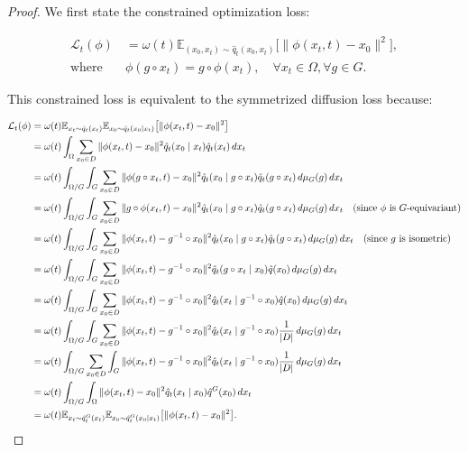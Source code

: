 \begin{proof}
    We first state the constrained optimization loss:

\begin{align*}
    \mathcal{L}_t(\phi) &= \omega(t) \mathbb{E}_{(x_0, x_t) \sim \hat{q}_t(x_0, x_t)} \big[ \| \phi(x_t, t) - x_0 \|^2 \big], \\
    \text{where} \quad &\phi(g \circ x_t) = g \circ \phi(x_t), \quad \forall x_t \in \Omega, \forall g \in G.
\end{align*}

This constrained loss is equivalent to the symmetrized diffusion loss because:

\begin{align*}
    \mathcal{L}_t(\phi) &= \omega(t) \mathbb{E}_{x_t \sim \hat{q}_t(x_t)} \mathbb{E}_{x_0 \sim \hat{q}_t(x_0 \mid x_t)} \big[ \| \phi(x_t, t) - x_0 \|^2 \big] \\
    &= \omega(t) \int_\Omega \sum_{x_0 \in D} \| \phi(x_t, t) - x_0 \|^2 \hat{q}_t(x_0 \mid x_t) \hat{q}_t(x_t) \,dx_t \\
    &= \omega(t) \int_{\Omega / G} \int_G \sum_{x_0 \in D} \| \phi(g \circ x_t, t) - x_0 \|^2 \hat{q}_t(x_0 \mid g \circ x_t) \hat{q}_t( g \circ x_t) \,d\mu_G(g) \,dx_t \\
    &= \omega(t) \int_{\Omega / G} \int_G \sum_{x_0 \in D} \| g \circ \phi(x_t, t) - x_0 \|^2 \hat{q}_t(x_0 \mid g \circ x_t) \hat{q}_t( g \circ x_t) \,d\mu_G(g) \,dx_t \quad \text{(since \( \phi \) is \( G \)-equivariant)} \\
    &= \omega(t) \int_{\Omega / G} \int_G \sum_{x_0 \in D} \|\phi( x_t, t) - g^{-1} \circ x_0 \|^2 \hat{q}_t(x_0 \mid g \circ x_t) \hat{q}_t( g \circ x_t) \,d\mu_G(g) \,dx_t \quad \text{(since \( g \) is isometric)} \\
    &= \omega(t) \int_{\Omega / G} \int_G \sum_{x_0 \in D} \|\phi( x_t, t) - g^{-1} \circ x_0 \|^2 \hat{q}_t( g \circ x_t \mid x_0 )  \hat{q}(x_0) \,d\mu_G(g) \,dx_t \\
    &= \omega(t) \int_{\Omega / G} \int_G \sum_{x_0 \in D} \|\phi( x_t, t) - g^{-1} \circ x_0 \|^2 \hat{q}_t( x_t \mid g^{-1} \circ x_0 )  \hat{q}(x_0) \,d\mu_G(g) \,dx_t \\
    &= \omega(t) \int_{\Omega / G} \int_G \sum_{x_0 \in D} \|\phi( x_t, t) - g^{-1} \circ x_0 \|^2 \hat{q}_t( x_t \mid g^{-1} \circ x_0 )  \frac{1}{|D|} \,d\mu_G(g) \,dx_t \\
    &= \omega(t) \int_{\Omega / G} \sum_{x_0 \in D} \int_G \|\phi( x_t, t) - g^{-1} \circ x_0 \|^2 \hat{q}_t( x_t \mid g^{-1} \circ x_0 )  \frac{1}{|D|} \,d\mu_G(g) \,dx_t \\
    &= \omega(t) \int_{\Omega / G} \int_{\Omega} \|\phi( x_t, t) - x_0 \|^2 \hat{q}_t( x_t \mid  x_0 ) \hat{q}^G(x_0)  \,dx_t \\
    &= \omega(t) \mathbb{E}_{x_t \sim \hat{q}_t^G(x_t)} \mathbb{E}_{x_0 \sim \hat{q}^G_t(x_0 \mid x_t)} \big[ \| \phi(x_t, t) - x_0 \|^2 \big].
\end{align*}


\end{proof}
